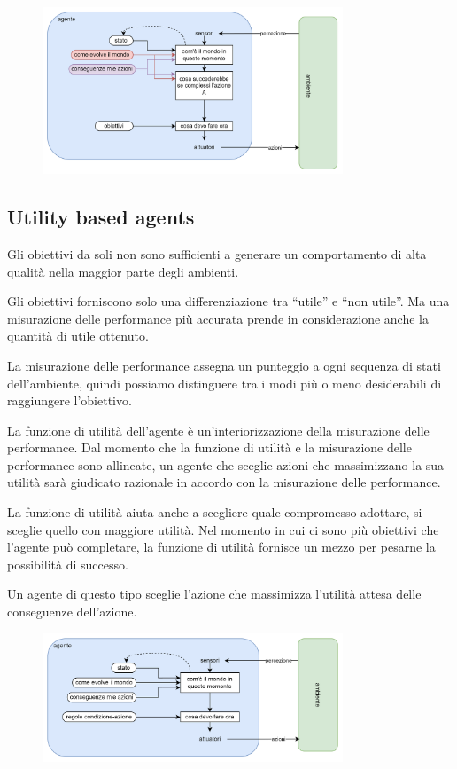 \begin{figure}[H]
	\centering
	\includegraphics[width=0.8\textwidth]{capitoli/agenti-intelligenti/imgs/goal-based.png}
\end{figure}

\subsection{\foreignlanguage{english}{Utility based agents}}

Gli obiettivi da soli non sono sufficienti a generare un comportamento di alta qualità nella maggior parte degli ambienti.

Gli obiettivi forniscono solo una differenziazione tra “utile” e “non utile”. Ma una misurazione delle performance più accurata prende in considerazione anche la quantità di utile ottenuto.

La misurazione delle performance assegna un punteggio a ogni sequenza di stati dell'ambiente, quindi possiamo distinguere tra i modi più o meno desiderabili di raggiungere l'obiettivo.

La funzione di utilità dell'agente è un'interiorizzazione della misurazione delle performance.
Dal momento che la funzione di utilità e la misurazione delle performance sono allineate, un agente che sceglie azioni che massimizzano la sua utilità sarà giudicato razionale in accordo con la misurazione delle performance.

La funzione di utilità aiuta anche a scegliere quale compromesso adottare, si sceglie quello con maggiore utilità. Nel momento in cui ci sono più obiettivi che l'agente può completare, la funzione di utilità fornisce un mezzo per pesarne la possibilità di successo.

Un agente di questo tipo sceglie l'azione che massimizza l'utilità attesa delle conseguenze dell'azione.

\begin{figure}[H]
	\centering
	\includegraphics[width=0.8\textwidth]{capitoli/agenti-intelligenti/imgs/model-based.png}
\end{figure}

